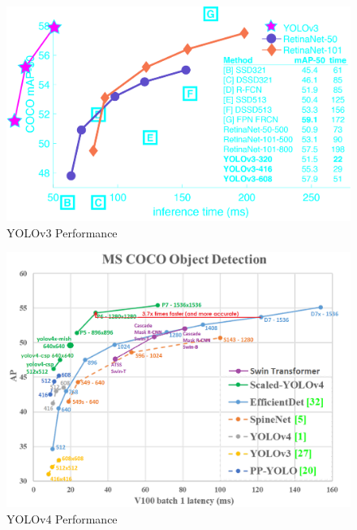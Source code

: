 \documentclass[acmtog, authorversion]{acmart}
\begin{document}
\begin{figure}[H]
 \includegraphics[width=1\columnwidth]{yolov3_perf.png}
 \caption{YOLOv3 Performance}
 \label{fig: Yolov3chart}
\end{figure}
\begin{figure}[H]
 \includegraphics[width=1\columnwidth]{yolov4_perf.png}
 \caption{YOLOv4 Performance}
 \label{fig: Yolov4chart}
\end{figure}
\end{document}
